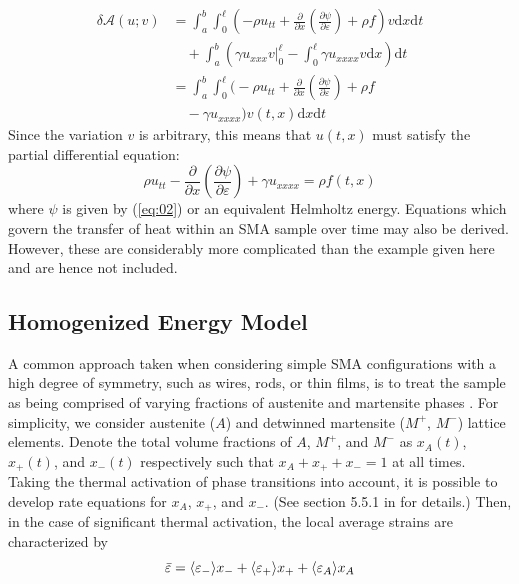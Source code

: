 \begin{multicols}{2}
\begin{align*}
    \delta \mathcal{A}(u;v) &= \int_a^b \int_0^{\ell} \left(-\rho u_{tt} + \frac{\partial}{\partial x} \left(\frac{\partial\psi}{\partial\varepsilon}\right) + \rho f \right) v\mathrm{d}x\mathrm{d}t \\
    & \quad + \int_a^b \left(\gamma u_{xxx}v\biggr\rvert_0^{\ell} - \int_0^{\ell}\gamma u_{xxxx}v\mathrm{d}x \right)\mathrm{d}t \\
    &= \int_a^b \int_0^{\ell} \bigg( -\rho u_{tt} + \frac{\partial}{\partial x}\left( \frac{\partial\psi}{\partial\varepsilon}\right) + \rho f\\
    & \quad -\gamma u_{xxxx} \bigg) v(t,x) \mathrm{d}x \mathrm{d}t
\end{align*}
Since the variation $v$ is arbitrary, this means that $u(t,x)$ must satisfy the partial differential equation:
\begin{equation} \label{PDE_u}
    \rho u_{tt} - \frac{\partial}{\partial x}\left(\frac{\partial\psi}{\partial \varepsilon} \right) + \gamma u_{xxxx} = \rho f(t,x)
\end{equation}
where $\psi$ is given by (\ref{eq:02}) or an equivalent Helmholtz energy. Equations which govern the transfer of heat within an SMA sample over time may also be derived. However, these are considerably more complicated than the example given here and are hence not included. 

\subsection{Homogenized Energy Model} \label{sec:HEM}
A common approach taken when considering simple SMA configurations with a high degree of symmetry, such as wires, rods, or thin films, is to treat the sample as being comprised of varying fractions of austenite and martensite phases \cite{smith2005smart}. For simplicity, we consider austenite ($A$) and detwinned martensite ($M^+$, $M^-$) lattice elements. Denote the total volume fractions of $A$, $M^+$, and $M^-$ as $x_A(t)$, $x_+(t)$, and $x_-(t)$ respectively such that $x_A + x_+ + x_- = 1$ at all times. Taking the thermal activation of phase transitions into account, it is possible to develop rate equations for $x_A$, $x_+$, and $x_-$. (See section 5.5.1 in \cite{smith2005smart} for details.) Then, in the case of significant thermal activation, the local average strains are characterized by
\begin{equation} \label{eq:local_strains}
    \Bar{\varepsilon} =  \langle\varepsilon_-\rangle x_- + \langle\varepsilon_+\rangle x_+ + \langle\varepsilon_A\rangle x_A
\end{equation}


\end{multicols}
